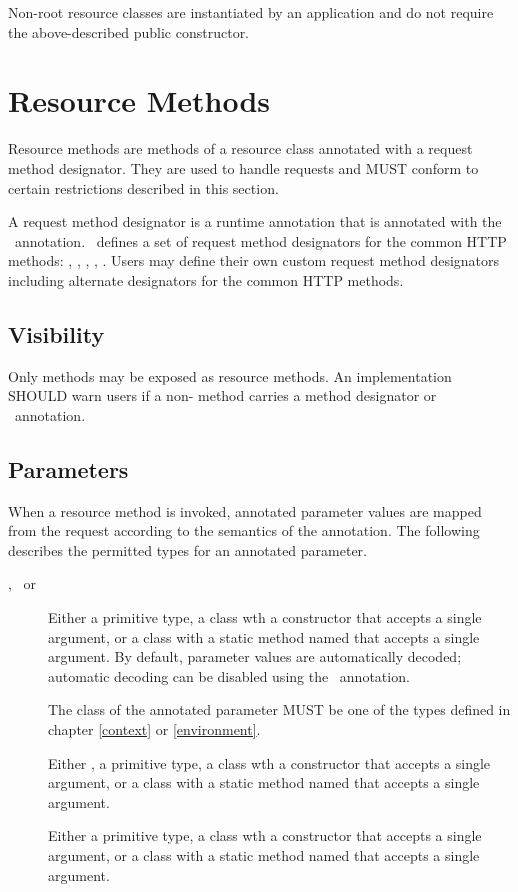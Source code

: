 Non-root resource classes are instantiated by an application and do not require the above-described public constructor.

\section{Resource Methods}
\label{resource_method}

Resource methods are methods of a resource class annotated with a request method designator. They are used to handle requests and MUST conform to certain restrictions described in this section.

A request method designator is a runtime annotation that is annotated with the \HttpMethod\ annotation. \jaxrs\ defines a set of request method designators for the common HTTP methods: , , , , . Users may define their own custom request method designators including alternate designators for the common HTTP methods.

\subsection{Visibility}

Only  methods may be exposed as resource methods. An implementation SHOULD warn users if a non- method carries a method designator or \Path\ annotation.

\subsection{Parameters}
\label{resource_method_params}

When a resource method is invoked, annotated parameter values are mapped from the request according to the semantics of the annotation. The following describes the permitted types for an annotated parameter.
\begin{description}
\item[\MatrixParam, \QueryParam\ or \PathParam] Either a primitive type, a class wth a constructor that accepts a single  argument, or a class with a static method named  that accepts a single  argument. By default, parameter values are automatically decoded; automatic decoding can be disabled using the \Encoded\ annotation.
\item[\Context] The class of the annotated parameter MUST be one of the types defined in chapter \ref{context} or \ref{environment}.
\item[\CookieParam] Either , a primitive type, a class wth a constructor that accepts a single  argument, or a class with a static method named  that accepts a single  argument.
\item[\HeaderParam] Either a primitive type, a class wth a constructor that accepts a single  argument, or a class with a static method named  that accepts a single  argument.
\end{description}

